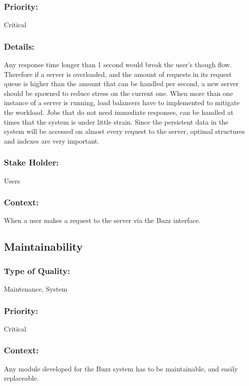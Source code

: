\documentclass[11pt]{article}
\begin{document}
		\subsubsection{Priority:}
			\textbf{}Critical
		
		\subsubsection{Details:}
			\textbf{}Any response time longer than 1 second would break the user's though flow. Therefore if a server is overloaded, and the amount of requests in its request queue is higher than the amount that can be handled per second, a new server should be spawned to reduce stress on the current one. When more than one instance of a server is running, load balancers have to implemented to mitigate the workload. Jobs that do not need immediate responses, can be handled at times that the system is under little strain. Since the persistent data in the system will be accessed on almost every request to the server, optimal structures and indexes are very important.
		
		\subsubsection{Stake Holder:}
			\textbf{}Users

		\subsubsection{Context:}
			\textbf{}When a user makes a request to the server via the Buzz interface.
	\subsection{Maintainability}
		\subsubsection{Type of Quality:}
			\textbf{}Maintenance, System
		
		\subsubsection{Priority:}
			\textbf{}Critical

		\subsubsection{Context:}
			\textbf{}Any module developed for the Buzz system has to be maintainable, and easily replaceable.
		
\end{document}
